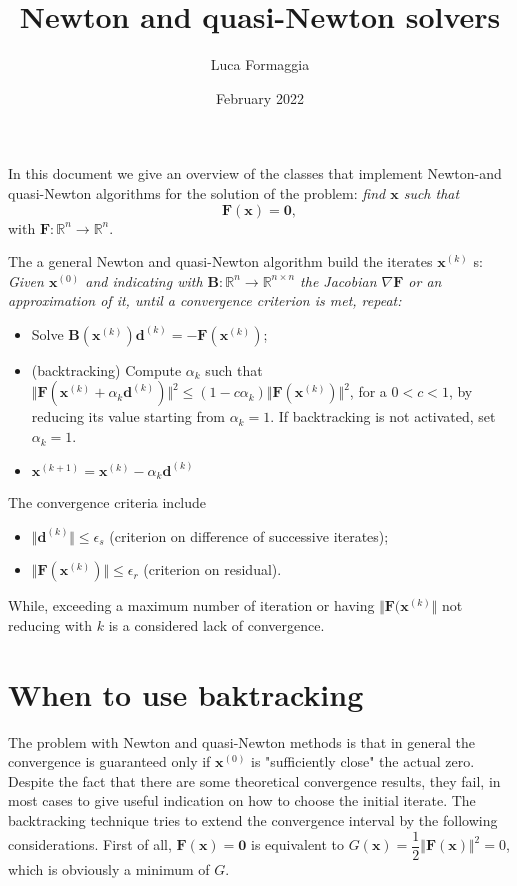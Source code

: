 \documentclass{article}
\author{Luca Formaggia}
\title{Newton and quasi-Newton solvers}
\date{February 2022}
\begin{document}
\maketitle

In this document we give an overview of the classes that implement Newton-and quasi-Newton algorithms for the solution of the problem: \emph{find $\mathbf{x}$
    such that}
\begin{equation}
\mathbf{F}(\mathbf{x})=\mathbf{0},
\end{equation}
    with $\mathbf{F}:\mathbb{R}^n\to\mathbb{R}^n$.
   
The a general Newton and quasi-Newton algorithm build the iterates   $\mathbf{x}^{(k)}$ s:
\emph{Given $\mathbf{x}^{(0)}$ and indicating with $\mathbf{B}:\mathbb{R}^n\to\mathbb{R}^{n\times n}$ the Jacobian $\nabla\mathbf{F}$ or an approximation of it, until a convergence criterion is met, repeat:} 
\begin{itemize}
    \item Solve $\mathbf{B}(\mathbf{x}^{(k)})\mathbf{d}^{(k)}=-\mathbf{F}(\mathbf{x}^{(k)})$;
    \item (backtracking) Compute $\alpha_k$ such that
    $\Vert\mathbf{F}(\mathbf{x}^{(k)}+\alpha_k\mathbf{d}^{(k)})\Vert^2\le(1-c\alpha_k) \Vert\mathbf{F}(\mathbf{x}^{(k)})\Vert^2$,
    for a $0<c<1$, by reducing its value starting from $\alpha_k=1$. If backtracking is not activated, set $\alpha_k=1$.
    \item $\mathbf{x}^{(k+1)}=\mathbf{x}^{(k)} -\alpha_k\mathbf{d}^{(k)}$
\end{itemize}

The convergence criteria include
\begin{itemize}
    \item $\Vert\mathbf{d}^{(k)}\Vert\le\epsilon_s$ (criterion on difference of successive iterates);
    \item $\Vert\mathbf{F}(\mathbf{x}^{(k)})\Vert\le\epsilon_r$ (criterion on residual).
\end{itemize}
While, exceeding a maximum number of iteration or having $\Vert\mathbf{F}(\mathbf{x}^{(k)}\Vert$ not reducing with $k$
is a considered lack of convergence.

\section{When to use baktracking}
The problem with Newton and quasi-Newton methods is that in general the convergence is guaranteed only if $\mathbf{x}^{(0)}$ is "sufficiently close" the actual zero. Despite the fact that there are some theoretical convergence results, they fail, in most cases to give useful indication on how to choose the initial iterate. 
The backtracking technique tries to extend the convergence interval by the following considerations. First of all,  $\mathbf{F}(\mathbf{x})=\mathbf{0}$ is equivalent to $G(\mathbf{x})=\dfrac{1}{2}\Vert\mathbf{F}(\mathbf{x})\Vert^2=0$,
which is obviously a minimum of $G$.
\end{document}
